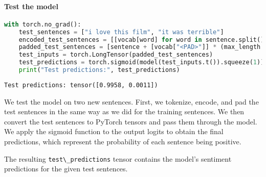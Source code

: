 \paragraph{Test the model}\label{test-the-model}

\begin{lstlisting}[language=Python]
with torch.no_grad():
    test_sentences = ["i love this film", "it was terrible"]
    encoded_test_sentences = [[vocab[word] for word in sentence.split()] for sentence in test_sentences]
    padded_test_sentences = [sentence + [vocab["<PAD>"]] * (max_length - len(sentence)) for sentence in encoded_test_sentences]
    test_inputs = torch.LongTensor(padded_test_sentences)
    test_predictions = torch.sigmoid(model(test_inputs.t()).squeeze(1))
    print("Test predictions:", test_predictions)
\end{lstlisting}

\begin{lstlisting}
Test predictions: tensor([0.9958, 0.0011])
\end{lstlisting}

We test the model on two new sentences. First, we tokenize, encode, and
pad the test sentences in the same way as we did for the training
sentences. We then convert the test sentences to PyTorch tensors and
pass them through the model. We apply the sigmoid function to the output
logits to obtain the final predictions, which represent the probability
of each sentence being positive.

The resulting \lstinline{test\_predictions} tensor
contains the model's sentiment predictions for the given test sentences.
